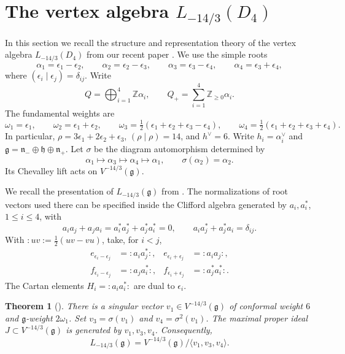 \documentclass[11pt]{amsart}
\numberwithin{equation}{section}
\newtheorem{theorem}{Theorem}[section]
\theoremstyle{definition}
\theoremstyle{remark}
\newcommand{\ZZ}{\mathbb Z}
\newcommand{\g}{\mathfrak g}
\newcommand{\h}{\mathfrak h}
\begin{document}
\section{The vertex algebra \texorpdfstring{$L_{-14/3}(D_4)$}{L(-14/3)(D4)}}
\label{sec:affine-AV}
In this section we recall the structure and representation theory of the vertex algebra $L_{-14/3}(D_4)$ from our recent paper \cite{AV}.
\vskip 5mm 
We use the simple roots
\[
 \alpha_1=\epsilon_1-\epsilon_2,\qquad
 \alpha_2=\epsilon_2-\epsilon_3,\qquad
 \alpha_3=\epsilon_3-\epsilon_4,\qquad
 \alpha_4=\epsilon_3+\epsilon_4,
\]
where $(\epsilon_i\mid\epsilon_j)=\delta_{ij}$. Write
\[
 Q=\bigoplus_{i=1}^4\ZZ\alpha_i,\qquad
 Q_+=\sum_{i=1}^4\ZZ_{\geq0}\alpha_i.
\]
The fundamental weights are
\[
 \omega_1=\epsilon_1,\qquad \omega_2=\epsilon_1+\epsilon_2,
 \qquad
 \omega_3=\tfrac12(\epsilon_1+\epsilon_2+\epsilon_3-\epsilon_4),
 \qquad
 \omega_4=\tfrac12(\epsilon_1+\epsilon_2+\epsilon_3+\epsilon_4).
\]
In particular, $\rho=3\epsilon_1+2\epsilon_2+\epsilon_3$,
$(\rho\mid\rho)=14$, and $h^\vee=6$.
Write $h_i=\alpha_i^\vee$ and
$\g=\mathfrak n_-\oplus\h\oplus\mathfrak n_+$.
Let $\sigma$ be the diagram automorphism determined by
\[
 \alpha_1\longmapsto\alpha_3\longmapsto\alpha_4
 \longmapsto\alpha_1,\qquad \sigma(\alpha_2)=\alpha_2.
\]
Its Chevalley lift acts on $V^{-14/3}(\g)$.

We recall the presentation of $L_{-14/3}(\g)$ from \cite{AV}.
The normalizations of root vectors used there can be specified inside the
Clifford algebra generated by $a_i,a_i^*$, $1\leq i\leq4$, with
\[
 a_i a_j+a_j a_i=a_i^*a_j^*+a_j^*a_i^*=0,
 \qquad a_i a_j^*+a_j^*a_i=\delta_{ij}.
\]
With $:uv:=\tfrac12(uv-vu)$, take, for $i<j$,
\[
 \begin{aligned}
 e_{\epsilon_i-\epsilon_j}&=:a_i a_j^*:,&
 e_{\epsilon_i+\epsilon_j}&=:a_i a_j:,\\
 f_{\epsilon_i-\epsilon_j}&=:a_j a_i^*:,&
 f_{\epsilon_i+\epsilon_j}&=:a_j^*a_i^*:.
 \end{aligned}
\]
The Cartan elements $H_i=:a_i a_i^*:$ are dual to $\epsilon_i$.

\begin{theorem}[{\cite[Theorems 3.1 and 3.6]{AV}}]
\label{thm:AV-presentation}
There is a singular vector $v_1\in V^{-14/3}(\g)$ of conformal weight
$6$ and $\g$-weight $2\omega_1$. Set
$v_3=\sigma(v_1)$ and $v_4=\sigma^2(v_1)$. The maximal proper ideal
$J\subset V^{-14/3}(\g)$ is generated by $v_1,v_3,v_4$. Consequently,
\[
 L_{-14/3}(\g)=V^{-14/3}(\g)/\langle v_1,v_3,v_4\rangle.
\]
\end{theorem}
\end{document}

